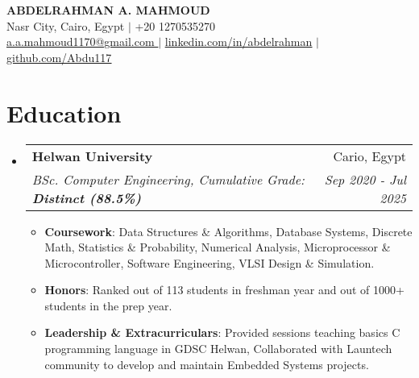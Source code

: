 \documentclass[letterpaper,11pt]{article}
\makeatletter
\newcommand{\resumeItem}[1]{
  \item\small{
    {#1 \vspace{-2pt}}
  }
}
\newcommand{\resumeSubheading}[4]{
  \vspace{-2pt}\item
    \begin{tabular*}{0.97\textwidth}[t]{l@{\extracolsep{\fill}}r}
      \textbf{#1} & #2 \\
      \textit{\small#3} & \textit{\small #4} \\
    \end{tabular*}\vspace{-7pt}
}
\newcommand{\resumeSubHeadingListStart}{\begin{itemize}[leftmargin=0.15in, label={}]}
\newcommand{\resumeSubHeadingListEnd}{\end{itemize}}
\newcommand{\resumeItemListStart}{\begin{itemize}}
\newcommand{\resumeItemListEnd}{\end{itemize}\vspace{-5pt}}
\makeatother
\begin{document}

\begin{center}
    \textbf{\Huge \scshape ABDELRAHMAN A. MAHMOUD} \\ \vspace{1pt}
    \small Nasr City, Cairo, Egypt  $|$ +20 1270535270 \\ \vspace{1pt} \href{a.a.mahmoud1170@gmail.com}{\underline{a.a.mahmoud1170@gmail.com }} $|$ 
    \href{https://www.linkedin.com/in/abdelrahman-ashraf-869998221/}{\underline{linkedin.com/in/abdelrahman}} $|$
    \href{https://github.com/Abdu117}{\underline{github.com/Abdu117}}
\end{center}

\section{Education}
  \resumeSubHeadingListStart
    \resumeSubheading
      {Helwan University} {Cario, Egypt}
      { BSc. Computer Engineering, Cumulative Grade: \textbf{Distinct (88.5\%)}}{Sep 2020 - Jul 2025}
        \resumeItemListStart
        \resumeItem{\textbf {Coursework}: Data Structures \& Algorithms, Database Systems, Discrete Math, Statistics \& Probability, Numerical Analysis, Microprocessor \& Microcontroller, Software Engineering, VLSI Design \& Simulation.}
        
      \resumeItem{  \textbf {Honors}: Ranked  out of 113 students in freshman year and \nth{4} out of 1000+ students in the prep year.}
        
        \resumeItem{  \textbf{Leadership \& Extracurriculars}: Provided sessions teaching basics C programming language in GDSC Helwan, Collaborated with Launtech community to develop and maintain Embedded Systems projects.}
        \resumeItemListEnd
    
  \resumeSubHeadingListEnd     


\end{document}
